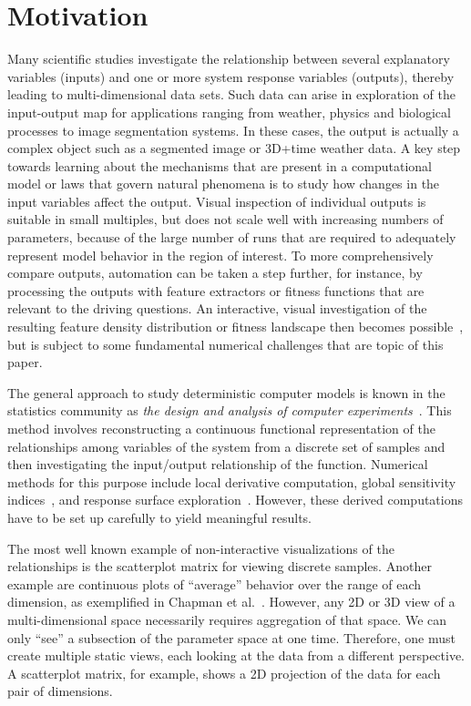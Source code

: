 
\section{Motivation}

Many scientific studies investigate the relationship between
several explanatory variables (inputs) and one or more system response
variables (outputs), thereby leading to multi-dimensional data sets.  Such data
can arise in exploration of the input-output map for applications ranging from
weather, physics and biological processes to image segmentation systems.  
In these cases, the output
is actually a complex object such as a segmented image or 3D+time weather data.
A key step towards learning about the mechanisms that are present in a
computational model or laws that govern natural phenomena is to study how
changes in the input variables affect the output.  Visual inspection of
individual outputs is suitable in small multiples, but does not scale well with
increasing numbers of parameters, because of the large number of runs that are
required to adequately represent model behavior in the region of interest.  To
more comprehensively compare outputs, automation can be taken a step further,
for instance, by processing the outputs with feature extractors or fitness
functions that are relevant to the driving questions.  An interactive, visual
investigation of the resulting feature density distribution or fitness
landscape then becomes
possible~\cite{Feiner:1990,Muhlbacher:2013,Piringer:2010}, but is subject to 
some fundamental numerical
challenges that are topic of this paper.

The general approach to
study deterministic computer models is known in the statistics community as
\emph{the design and analysis of computer experiments}~\cite{Santner:2003}.
This method involves reconstructing a continuous functional representation of
the relationships among variables of the system from a discrete set of 
samples and then investigating the
input/output relationship of the function.  Numerical methods for
this purpose include local derivative computation, global sensitivity
indices~\cite{Saltelli:2008}, and response surface
exploration~\cite{Box:2007}.  However, these derived computations have to be
set up carefully to yield meaningful results. 

The most well known example of non-interactive visualizations of the 
relationships is the scatterplot 
matrix for viewing discrete samples.
Another example are continuous plots of ``average'' behavior over the 
range of each
dimension, as exemplified in Chapman et al.~\cite{Chapman:1994}.
However, any 2D or 3D view of a multi-dimensional space necessarily requires
aggregation of that space.
We can only ``see'' a subsection of the parameter
space at one time.
Therefore, one must create multiple static views, each looking at 
the data from a different perspective.  A scatterplot matrix, for example,
shows a 2D projection of the data for each pair of dimensions.

